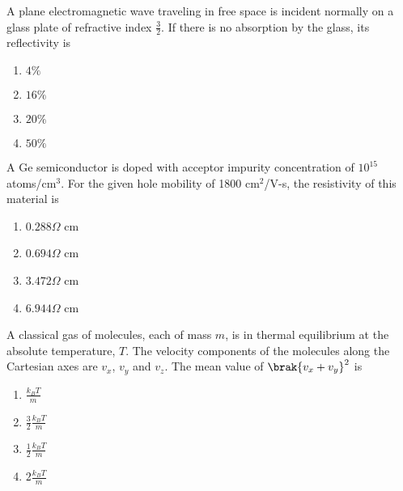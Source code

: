 \item A plane electromagnetic wave traveling in free space is incident normally on a glass plate of
refractive index $\frac{3}{2}$. If there is no absorption by the glass, its reflectivity is
\begin{multicols}{2}
    \begin{enumerate}
        \item $4 \%$
        \item $16 \%$
        \item $20 \%$
        \item $50 \%$
    \end{enumerate}
\end{multicols}

\item A Ge semiconductor is doped with acceptor impurity concentration of $10^{15}$ atoms/cm$^3$. For the given hole mobility of 1800 cm$^{2}$/V-s, the resistivity of this material is
\begin{multicols}{2}
    \begin{enumerate}
        \item $0.288 \Omega$ cm
        \item $0.694 \Omega$ cm
        \item $3.472 \Omega$ cm
        \item $6.944 \Omega$ cm
    \end{enumerate}
\end{multicols}

\item A classical gas of molecules, each of mass $m$, is in thermal equilibrium at the absolute temperature, $T$. The velocity components of the molecules along the Cartesian axes are $v_x$, $v_y$ and $v_z$. The mean value of $\brak{v_x + v_y}^2$ is
\begin{multicols}{2}
    \begin{enumerate}
        \item $\frac{k_B T}{m}$
        \item $\frac{3}{2} \frac{k_B T}{m}$
        \item $\frac{1}{2} \frac{k_B T}{m}$
        \item $2\frac{k_B T}{m}$
    \end{enumerate}
\end{multicols}
